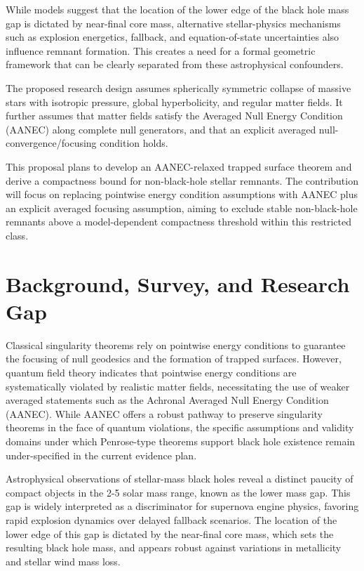 \documentclass[conference]{IEEEtran}
\begin{document}
While models suggest that the location of the lower edge of the black hole mass gap is dictated by near-final core mass, alternative stellar-physics mechanisms such as explosion energetics, fallback, and equation-of-state uncertainties also influence remnant formation. This creates a need for a formal geometric framework that can be clearly separated from these astrophysical confounders.~\cite{cite_7a407c865faafd11}

The proposed research design assumes spherically symmetric collapse of massive stars with isotropic pressure, global hyperbolicity, and regular matter fields. It further assumes that matter fields satisfy the Averaged Null Energy Condition (AANEC) along complete null generators, and that an explicit averaged null-convergence/focusing condition holds.

This proposal plans to develop an AANEC-relaxed trapped surface theorem and derive a compactness bound for non-black-hole stellar remnants. The contribution will focus on replacing pointwise energy condition assumptions with AANEC plus an explicit averaged focusing assumption, aiming to exclude stable non-black-hole remnants above a model-dependent compactness threshold within this restricted class.

\section{Background, Survey, and Research Gap}
Classical singularity theorems rely on pointwise energy conditions to guarantee the focusing of null geodesics and the formation of trapped surfaces. However, quantum field theory indicates that pointwise energy conditions are systematically violated by realistic matter fields, necessitating the use of weaker averaged statements such as the Achronal Averaged Null Energy Condition (AANEC). While AANEC offers a robust pathway to preserve singularity theorems in the face of quantum violations, the specific assumptions and validity domains under which Penrose-type theorems support black hole existence remain under-specified in the current evidence plan.~\cite{cite_0ed84243cf171bc4}

Astrophysical observations of stellar-mass black holes reveal a distinct paucity of compact objects in the 2-5 solar mass range, known as the lower mass gap. This gap is widely interpreted as a discriminator for supernova engine physics, favoring rapid explosion dynamics over delayed fallback scenarios. The location of the lower edge of this gap is dictated by the near-final core mass, which sets the resulting black hole mass, and appears robust against variations in metallicity and stellar wind mass loss.~\cite{cite_7a407c865faafd11}
\end{document}

